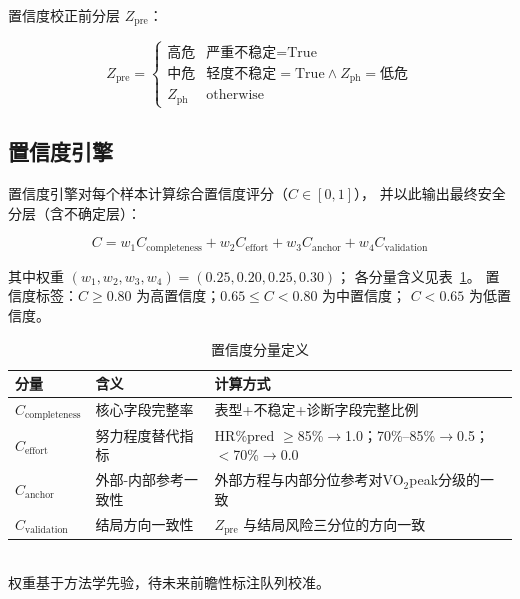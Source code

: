\documentclass[12pt, a4paper]{ctexart}
\begin{document}
置信度校正前分层 $Z_{\text{pre}}$：

\begin{equation}
\label{eq:pre_confidence_zone}
Z_{\text{pre}} =
\begin{cases}
\text{高危}   & \text{严重不稳定} = \text{True} \\
\text{中危}   & \text{轻度不稳定} = \text{True} \wedge Z_{\text{ph}} = \text{低危} \\
Z_{\text{ph}} & \text{otherwise}
\end{cases}
\end{equation}

\subsection{置信度引擎}

置信度引擎对每个样本计算综合置信度评分（$C \in [0,1]$），
并以此输出最终安全分层（含不确定层）：

\begin{equation}
\label{eq:confidence}
C = w_1 C_{\text{completeness}} + w_2 C_{\text{effort}}
    + w_3 C_{\text{anchor}} + w_4 C_{\text{validation}}
\end{equation}

其中权重 $(w_1, w_2, w_3, w_4) = (0.25, 0.20, 0.25, 0.30)$；
各分量含义见表~\ref{tab:confidence_components}。
置信度标签：$C \geq 0.80$ 为高置信度；$0.65 \leq C < 0.80$ 为中置信度；
$C < 0.65$ 为低置信度。

\begin{table}[htbp]
\centering
\small
\caption{置信度分量定义}
\label{tab:confidence_components}
\begin{tabular}{lll}
\toprule
分量 & 含义 & 计算方式 \\
\midrule
$C_{\text{completeness}}$ & 核心字段完整率 & 表型+不稳定+诊断字段完整比例 \\
$C_{\text{effort}}$ & 努力程度替代指标 & HR\%pred $\geq$85\%$\to$1.0；70\%--85\%$\to$0.5；$<$70\%$\to$0.0 \\
$C_{\text{anchor}}$ & 外部-内部参考一致性 & 外部方程与内部分位参考对VO$_2$peak分级的一致 \\
$C_{\text{validation}}$ & 结局方向一致性 & $Z_{\text{pre}}$ 与结局风险三分位的方向一致 \\
\bottomrule
\end{tabular}
\\[1ex]
{\footnotesize 权重基于方法学先验，待未来前瞻性标注队列校准。}
\end{table}
\end{document}
